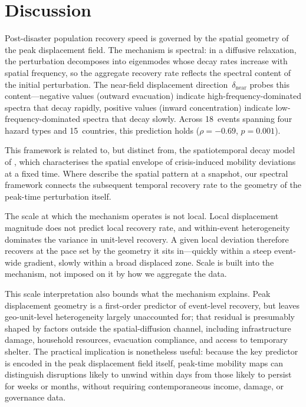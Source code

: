 \documentclass[11pt]{article}
\newcommand{\dnear}{\delta_{\mathrm{near}}}
\newcommand{\rhosp}{\rho}
\begin{document}
\FloatBarrier
\section*{Discussion}

Post-disaster population recovery speed is governed by the spatial geometry of the peak displacement field. The mechanism is spectral: in a diffusive relaxation, the perturbation decomposes into eigenmodes whose decay rates increase with spatial frequency, so the aggregate recovery rate reflects the spectral content of the initial perturbation. The near-field displacement direction~$\dnear$ probes this content---negative values (outward evacuation) indicate high-frequency-dominated spectra that decay rapidly, positive values (inward concentration) indicate low-frequency-dominated spectra that decay slowly. Across 18~events spanning four hazard types and 15~countries, this prediction holds ($\rhosp = -0.69$, $p = 0.001$).

This framework is related to, but distinct from, the spatiotemporal decay model of \citet{Li2022}, which characterises the spatial envelope of crisis-induced mobility deviations at a fixed time. Where \citet{Li2022} describe the spatial pattern at a snapshot, our spectral framework connects the subsequent temporal recovery rate to the geometry of the peak-time perturbation itself.

The scale at which the mechanism operates is not local. Local displacement magnitude does not predict local recovery rate, and within-event heterogeneity dominates the variance in unit-level recovery. A given local deviation therefore recovers at the pace set by the geometry it sits in---quickly within a steep event-wide gradient, slowly within a broad displaced zone. Scale is built into the mechanism, not imposed on it by how we aggregate the data.

This scale interpretation also bounds what the mechanism explains. Peak displacement geometry is a first-order predictor of event-level recovery, but leaves geo-unit-level heterogeneity largely unaccounted for; that residual is presumably shaped by factors outside the spatial-diffusion channel, including infrastructure damage, household resources, evacuation compliance, and access to temporary shelter. The practical implication is nonetheless useful: because the key predictor is encoded in the peak displacement field itself, peak-time mobility maps can distinguish disruptions likely to unwind within days from those likely to persist for weeks or months, without requiring contemporaneous income, damage, or governance data.
\end{document}
